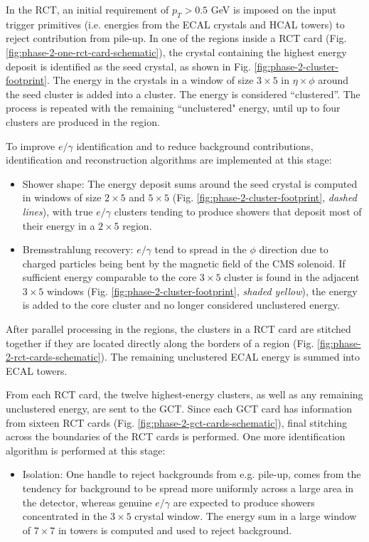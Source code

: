 In the RCT, an initial requirement of $p_{T} > 0.5$ GeV is imposed on the input trigger primitives (i.e. energies from the ECAL crystals and HCAL towers) to reject contribution from pile-up. In one of the regions inside a RCT card (Fig. \ref{fig:phase-2-one-rct-card-schematic}), the crystal containing the highest energy deposit is identified as the seed crystal, as shown in Fig. \ref{fig:phase-2-cluster-footprint}. The energy in the crystals in a window of size $3\times 5$ in $\eta\times\phi$ around the seed cluster is added into a cluster. The energy is considered ``clustered''. The process is repeated with the remaining ``unclustered" energy, until up to four clusters are produced in the region. 


To improve $e/\gamma$ identification and to reduce background contributions, identification and reconstruction algorithms are implemented at this stage:
\begin{itemize}
    \item Shower shape: The energy deposit sums around the seed crystal is computed in windows of size $2 \times 5$ and $5 \times 5$ (Fig. \ref{fig:phase-2-cluster-footprint}, \textit{dashed lines}), with true $e/\gamma$ clusters tending to produce showers that deposit most of their energy in a $2 \times 5$ region. 
    \item Bremsstrahlung recovery: $e/\gamma$ tend to spread in the $\phi$ direction due to charged particles being bent by the magnetic field of the CMS solenoid. If sufficient energy comparable to the core $3 \times 5$ cluster is found in the adjacent $3 \times 5$ windows (Fig. \ref{fig:phase-2-cluster-footprint}, \textit{shaded yellow}), the energy is added to the core cluster and no longer considered unclustered energy.
\end{itemize}

After parallel processing in the regions, the clusters in a RCT card are stitched together if they are located directly along the borders of a region (Fig. \ref{fig:phase-2-rct-cards-schematic}). The remaining unclustered ECAL energy is summed into ECAL towers. 

From each RCT card, the twelve highest-energy clusters, as well as any remaining unclustered energy, are sent to the GCT. Since each GCT card has information from sixteen RCT cards (Fig. \ref{fig:phase-2-gct-cards-schematic}), final stitching across the boundaries of the RCT cards is performed. One more identification algorithm is performed at this stage:
\begin{itemize}
    \item Isolation: One handle to reject backgrounds from e.g. pile-up, comes from the tendency for background to be spread more uniformly across a large area in the detector, whereas genuine $e/\gamma$ are expected to produce showers concentrated in the $3 \times 5$ crystal window. The energy sum in a large window of $7 \times 7$ in towers is computed and used to reject background.
\end{itemize}

